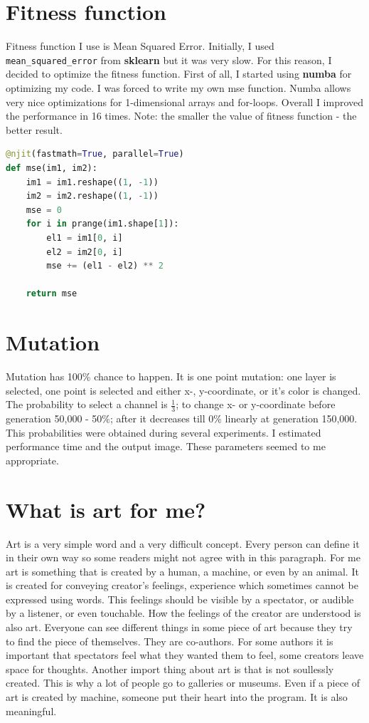 \documentclass{article}
\begin{document}
\section{Fitness function}
Fitness function I use is Mean Squared Error. Initially, I used \texttt{mean\_squared\_error} from \textbf{sklearn} but it was very slow. For this reason, I decided to optimize the fitness function. First of all, I started using \textbf{numba} for optimizing my code. I was forced to write my own mse function. Numba allows very nice optimizations for 1-dimensional arrays and for-loops. Overall I improved the performance in 16 times. Note: the smaller the value of fitness function - the better result.
\begin{lstlisting}[language=Python]
@njit(fastmath=True, parallel=True)
def mse(im1, im2):
    im1 = im1.reshape((1, -1))
    im2 = im2.reshape((1, -1))
    mse = 0
    for i in prange(im1.shape[1]):
        el1 = im1[0, i]
        el2 = im2[0, i]
        mse += (el1 - el2) ** 2

    return mse
\end{lstlisting}

\section{Mutation}
Mutation has 100\% chance to happen. It is one point mutation: one layer is selected, one point is selected and either x-, y-coordinate, or it's color is changed. The probability to select a channel is $\frac{1}{3}$; to change x- or y-coordinate before generation 50,000 - 50\%; after it decreases till 0\% linearly at generation 150,000.
This probabilities were obtained during several experiments. I estimated performance time and the output image. These parameters seemed to me appropriate.

\section{What is art for me?}
Art is a very simple word and a very difficult concept. Every person can define it in their own way so some readers might not agree with in this paragraph. For me art is something that is created by a human, a machine, or even by an animal. It is created for conveying creator's feelings, experience which sometimes cannot be expressed using words. This feelings should be visible by a spectator, or audible by a listener, or even touchable. How the feelings of the creator are understood is also art. Everyone can see different things in some piece of art because they try to find the piece of themselves. They are co-authors. For some authors it is important that spectators feel what they wanted them to feel, some creators leave space for thoughts. Another import thing about art is that is not soullessly created. This is why a lot of people go to galleries or museums. Even if a piece of art is created by machine, someone put their heart into the program. It is also meaningful.
\end{document}

